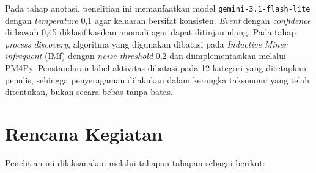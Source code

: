 Pada tahap anotasi, penelitian ini memanfaatkan model \texttt{gemini-3.1-flash-lite} dengan \textit{temperature} 0,1 agar keluaran bersifat konsisten. \textit{Event} dengan \textit{confidence} di bawah 0,45 diklasifikasikan anomali agar dapat ditinjau ulang. Pada tahap \textit{process discovery}, algoritma yang digunakan dibatasi pada \textit{Inductive Miner infrequent} (IMf) dengan \textit{noise threshold} 0,2 dan diimplementasikan melalui PM4Py. Penstandaran label aktivitas dibatasi pada 12 kategori yang ditetapkan penulis, sehingga penyeragaman dilakukan dalam kerangka taksonomi yang telah ditentukan, bukan secara bebas tanpa batas.


\section{Rencana Kegiatan}

Penelitian ini dilaksanakan melalui tahapan-tahapan sebagai berikut:


